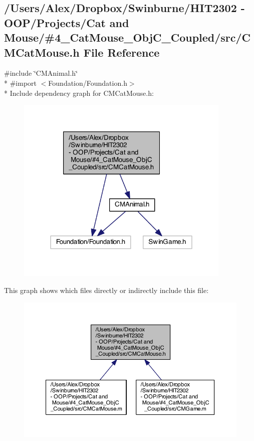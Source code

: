 \subsection{/\-Users/\-Alex/\-Dropbox/\-Swinburne/\-H\-I\-T2302 -\/ O\-O\-P/\-Projects/\-Cat and Mouse/\#4\-\_\-\-Cat\-Mouse\-\_\-\-Obj\-C\-\_\-\-Coupled/src/\-C\-M\-Cat\-Mouse.h File Reference}
\label{_c_m_cat_mouse_8h}
{\ttfamily \#include \char`\"{}C\-M\-Animal.\-h\char`\"{}}\\*
{\ttfamily \#import $<$Foundation/\-Foundation.\-h$>$}\\*
Include dependency graph for C\-M\-Cat\-Mouse.\-h\-:
\nopagebreak
\begin{figure}[H]
\begin{center}
\leavevmode
\includegraphics[width=291pt]{_c_m_cat_mouse_8h__incl}
\end{center}
\end{figure}
This graph shows which files directly or indirectly include this file\-:
\nopagebreak
\begin{figure}[H]
\begin{center}
\leavevmode
\includegraphics[width=350pt]{_c_m_cat_mouse_8h__dep__incl}
\end{center}
\end{figure}
